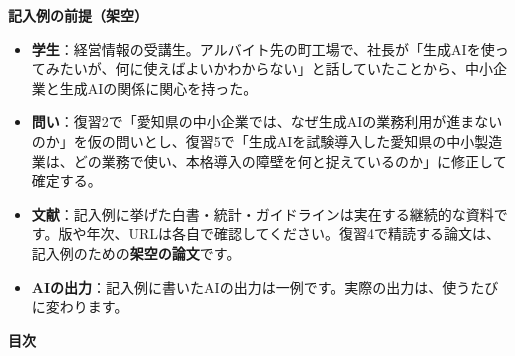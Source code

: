 \vspace{4mm}
\begin{tcolorbox}[enhanced,colback=white,colframe=rulegray,boxrule=0.5pt,arc=1.5mm,
    left=4mm,right=4mm,top=3mm,bottom=3mm,fontupper=\small]
{\sffamily\bfseries 記入例の前提（架空）}\par\vspace{1mm}
\begin{itemize}[label=・]
  \item \textbf{学生}：経営情報の受講生。アルバイト先の町工場で、社長が「生成AIを使ってみたいが、何に使えばよいかわからない」と話していたことから、中小企業と生成AIの関係に関心を持った。
  \item \textbf{問い}：復習2で「愛知県の中小企業では、なぜ生成AIの業務利用が進まないのか」を仮の問いとし、復習5で「生成AIを試験導入した愛知県の中小製造業は、どの業務で使い、本格導入の障壁を何と捉えているのか」に修正して確定する。
  \item \textbf{文献}：記入例に挙げた白書・統計・ガイドラインは実在する継続的な資料です。版や年次、URLは各自で確認してください。復習4で精読する論文は、記入例のための\textbf{架空の論文}です。
  \item \textbf{AIの出力}：記入例に書いたAIの出力は一例です。実際の出力は、使うたびに変わります。
\end{itemize}
\end{tcolorbox}

\vspace{6mm}
{\sffamily\bfseries 目次}\par\vspace{1mm}
{\small\makeatletter{}\makeatother}
